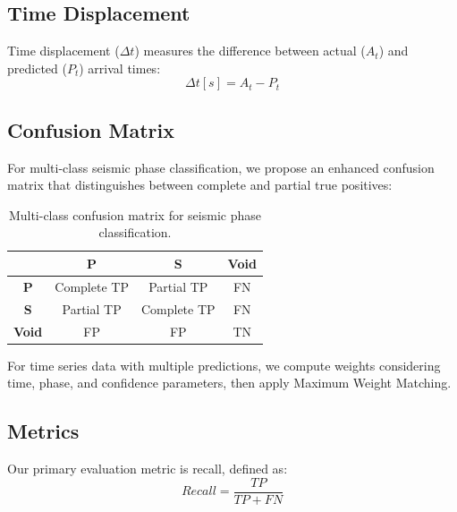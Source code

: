 \documentclass{llncs}
\begin{document}
\subsection{Time Displacement}
\label{subsec:Time}
Time displacement ($\Delta t$) measures the difference between actual ($A_t$) and predicted ($P_t$) arrival times:
\begin{equation}
  \Delta t [s] = A_t - P_t
\end{equation}

\subsection{Confusion Matrix}
\label{subsec:Confusion}
For multi-class seismic phase classification, we propose an enhanced confusion matrix that distinguishes between complete and partial true positives:

\begin{table}[h!]
  \centering
  \begin{tabular}{|c|c|c|c|}
    \hline
    & \textbf{P} & \textbf{S} & \textbf{Void}\\\hline
    \textbf{P} & Complete TP & Partial TP & FN \\\hline
    \textbf{S} & Partial TP & Complete TP & FN \\\hline
    \textbf{Void} & FP & FP & TN \\\hline
  \end{tabular}
  \caption{Multi-class confusion matrix for seismic phase classification.}
\end{table}

For time series data with multiple predictions, we compute weights considering time, phase, and confidence parameters, then apply Maximum Weight Matching.

\subsection{Metrics}
\label{subsec:Metrics}
Our primary evaluation metric is recall, defined as:
\begin{equation}
  Recall = \frac{TP}{TP + FN}
\end{equation}
\end{document}
